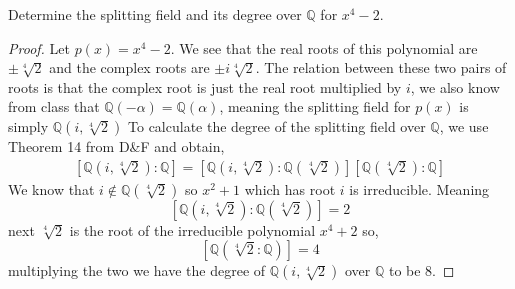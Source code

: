 \documentclass[11pt]{article}
\newenvironment{problem}[2][Problem\!]{\begin{trivlist}
\item[\hskip \labelsep {\bfseries #1}\hskip \labelsep {\bfseries #2}]}{\end{trivlist}}
\newcommand{\qq}{\mathbb Q}   %
\newcommand{\lrb}[1]{\left[#1\right]}
\begin{document}
\begin{problem}{13.4.1}
    Determine the splitting field and its degree over $\qq$ for $x^{4} - 2$.
\end{problem}
\begin{example}
    \begin{proof}
        Let $p(x) = x^{4} - 2$. We see that the real roots of this polynomial are $\pm\sqrt[4]{2}$ and the complex roots are $\pm i\sqrt[4]{2}$. The relation between these two pairs of roots is that the complex root is just the real root multiplied by $i$, we also know from class that $\qq(-\alpha) = \qq(\alpha)$, meaning the splitting field for $p(x)$ is simply $\qq(i, \sqrt[4]{2})$ To calculate the degree of the splitting field over $\qq$, we use Theorem 14 from D\&F and obtain,
        \begin{align*}
            \lrb{\qq(i, \sqrt[4]{2}): \qq} = \lrb{\qq(i, \sqrt[4]{2}): \qq(\sqrt[4]{2})}\lrb{\qq(\sqrt[4]{2}): \qq}
        \end{align*}
        We know that $i \notin \qq(\sqrt[4]{2})$ so $x^{2} + 1$ which has root $i$ is irreducible. Meaning \[\lrb{\qq(i, \sqrt[4]{2}): \qq(\sqrt[4]{2})} = 2\]
        next $\sqrt[4]{2}$ is the root of the irreducible polynomial $x^{4} + 2$ so,
        \[\lrb{\qq(\sqrt[4]{2} : \qq)} = 4\]
        multiplying the two we have the degree of $\qq(i, \sqrt[4]{2})$ over $\qq$ to be 8.

    \end{proof}
\end{example}

\newpage
\end{document}
